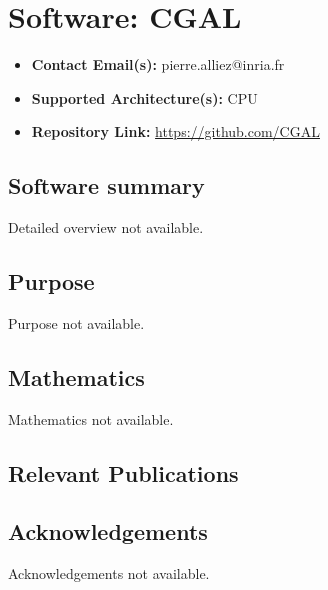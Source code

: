 \section{Software: CGAL}
\label{sec:CGAL:software}



\begin{itemize}
    \item \textbf{Contact Email(s):} pierre.alliez@inria.fr
    \item \textbf{Supported Architecture(s):} CPU
    \item \textbf{Repository Link:} \href{https://github.com/CGAL}{https://github.com/CGAL}
\end{itemize}

\subsection{Software summary}
\label{sec:CGAL:summary}
Detailed overview not available.



\subsection{Purpose}
\label{sec:CGAL:purpose}
Purpose not available.



\subsection{Mathematics}
\label{sec:CGAL:mathematics}
Mathematics not available.


\subsection{Relevant Publications}
\label{sec:CGAL:publications}

\subsection{Acknowledgements}
\label{sec::CGAL:acknowledgements}

Acknowledgements not available.


